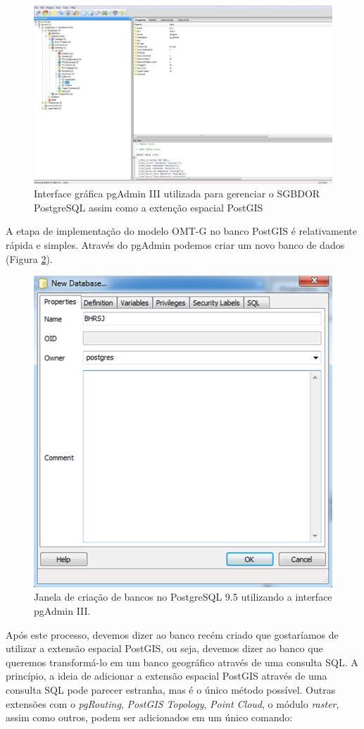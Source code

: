 	\begin{figure}
		\centering
		\includegraphics[width=1\linewidth]{data/pgAdmin-gui}
		\caption{Interface gráfica pgAdmin III utilizada para gerenciar o SGBDOR PostgreSQL assim como a extenção espacial PostGIS}
		\label{fig:pgadmin-gui}
	\end{figure}

A etapa de implementação do modelo OMT-G no banco PostGIS é relativamente rápida e simples. Através do pgAdmin podemos criar um novo banco de dados (Figura \ref{fig:newdbpgadmin}).

	\begin{figure}
		\centering
		\includegraphics[width=0.6\linewidth]{data/newdb_pgadmin}
		\caption{Janela de criação de bancos no PostgreSQL 9.5 utilizando a interface pgAdmin III.}
		\label{fig:newdbpgadmin}
	\end{figure}
	
Após este processo, devemos dizer ao banco recém criado que gostaríamos de utilizar a extensão espacial PostGIS, ou seja, devemos dizer ao banco que queremos transformá-lo em um banco geográfico através de uma consulta SQL. A princípio, a ideia de adicionar a extensão espacial PostGIS através de uma consulta SQL pode parecer estranha, mas é o único método possível. Outras extensões com o \textit{pgRouting}, \textit{PostGIS Topology}, \textit{Point Cloud}, o módulo \textit{raster}, assim como outros, podem ser adicionados em um único comando:

